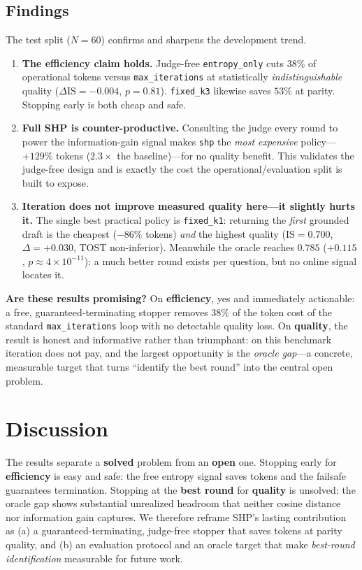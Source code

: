 \documentclass[conference]{IEEEtran}
\begin{document}
\subsection{Findings}
The test split ($N=60$) confirms and sharpens the development trend.
\begin{enumerate}[leftmargin=1.3em,itemsep=2pt,topsep=2pt]
\item \textbf{The efficiency claim holds.} Judge-free \texttt{entropy\_only} cuts
\textbf{$38\%$} of operational tokens versus \texttt{max\_iterations} at
statistically \emph{indistinguishable} quality ($\Delta\mathrm{IS}=-0.004$,
$p=0.81$). \texttt{fixed\_k3} likewise saves $53\%$ at parity. Stopping early is
both cheap and safe.
\item \textbf{Full SHP is counter-productive.} Consulting the judge every round to
power the information-gain signal makes \texttt{shp} the \emph{most expensive}
policy---$+129\%$ tokens ($2.3\times$ the baseline)---for no quality benefit. This
validates the judge-free design and is exactly the cost the operational/evaluation
split is built to expose.
\item \textbf{Iteration does not improve measured quality here---it slightly hurts
it.} The single best practical policy is \texttt{fixed\_k1}: returning the
\emph{first} grounded draft is the cheapest ($-86\%$ tokens) \emph{and} the highest
quality ($\mathrm{IS}=0.700$, $\Delta=+0.030$, TOST non-inferior). Meanwhile the
oracle reaches $0.785$ ($+0.115$, $p\!\approx\!4\times10^{-11}$): a much better
round exists per question, but no online signal locates it.
\end{enumerate}
\noindent\textbf{Are these results promising?} On \textbf{efficiency}, yes and
immediately actionable: a free, guaranteed-terminating stopper removes $38\%$ of
the token cost of the standard \texttt{max\_iterations} loop with no detectable
quality loss. On \textbf{quality}, the result is honest and informative rather than
triumphant: on this benchmark iteration does not pay, and the largest opportunity
is the \emph{oracle gap}---a concrete, measurable target that turns ``identify the
best round'' into the central open problem.

\section{Discussion}\label{sec:discussion}
The results separate a \textbf{solved} problem from an \textbf{open} one. Stopping
early for \textbf{efficiency} is easy and safe: the free entropy signal saves
tokens and the failsafe guarantees termination. Stopping at the \textbf{best round}
for \textbf{quality} is unsolved: the oracle gap shows substantial unrealized
headroom that neither cosine distance nor information gain captures. We therefore reframe
SHP's lasting contribution as (a) a guaranteed-terminating, judge-free stopper that
saves tokens at parity quality, and (b) an evaluation protocol and an oracle target
that make \emph{best-round identification} measurable for future work.
\end{document}
